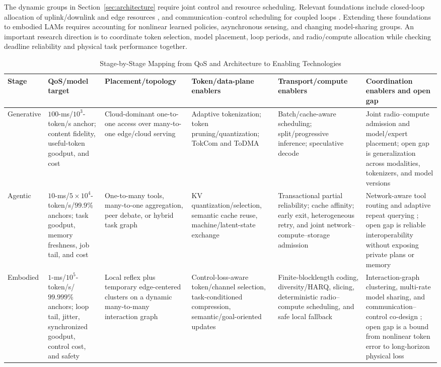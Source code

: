 \documentclass[letterpaper,journal]{IEEEtran}
\begin{document}
The dynamic groups in Section~\ref{sec:architecture} require joint control
and resource scheduling. Relevant foundations include closed-loop allocation
of uplink/downlink and edge resources \cite{fang}, and communication--control
scheduling for coupled loops \cite{pang}.
Extending these foundations to embodied LAMs requires accounting for nonlinear
learned policies, asynchronous sensing, and changing model-sharing groups.
An important research direction is to coordinate token selection, model
placement, loop periods, and radio/compute allocation while checking deadline
reliability and physical task performance together. 

\begin{table}[t]
\caption{Stage-by-Stage Mapping from QoS and Architecture to Enabling Technologies}
\label{tab:stageenablers}
\centering
\scriptsize
\renewcommand{\arraystretch}{1.17}
\setlength{\tabcolsep}{2.5pt}
\begin{tabular}{|p{}|p{}|p{}|p{}|p{}|p{}|}
\hline
\textbf{Stage} & \textbf{QoS/model target} & \textbf{Placement/topology} &
\textbf{Token/data-plane enablers} & \textbf{Transport/compute enablers} &
\textbf{Coordination enablers and open gap} \\ \hline
Generative &
$100$-ms/$10^3$-token/s anchor; content fidelity, useful-token goodput, and cost &
Cloud-dominant one-to-one access over many-to-one edge/cloud serving &
Adaptive tokenization; token pruning/quantization; TokCom and ToDMA
\cite{tokcom,todma} &
Batch/cache-aware scheduling; split/progressive inference; speculative decode
\cite{progressive,specdecode} &
Joint radio--compute admission and model/expert placement; open gap is
generalization across modalities, tokenizers, and model versions \\ \hline
Agentic &
$10$-ms/$5\!\times\!10^4$-token/s/$99.9\%$ anchors; task goodput, memory
freshness, job tail, and cost &
One-to-many tools, many-to-one aggregation, peer debate, or hybrid task graph &
KV quantization/selection, semantic cache reuse, machine/latent-state exchange
\cite{qkvcomm,kvcomm,semsharekv,latentcomm} &
Transactional partial reliability; cache affinity; early exit, heterogeneous
retry, and joint network--compute--storage admission &
Network-aware tool routing and adaptive repeat querying
\cite{netmcp,garq}; open gap is reliable interoperability without
exposing private plans or memory \\ \hline
Embodied &
$1$-ms/$10^5$-token/s/$99.999\%$ anchors; loop tail, jitter, synchronized
goodput, control cost, and safety &
Local reflex plus temporary edge-centered clusters on a dynamic many-to-many
interaction graph &
Control-loss-aware token/channel selection, task-conditioned compression,
semantic/goal-oriented updates &
Finite-blocklength coding, diversity/HARQ, slicing, deterministic radio--compute
scheduling, and safe local fallback &
Interaction-graph clustering, multi-rate model sharing, and communication--
control co-design \cite{fang,pang}; open gap is a bound from nonlinear token
error to long-horizon physical loss \\ \hline
\end{tabular}
\end{table}
\end{document}
